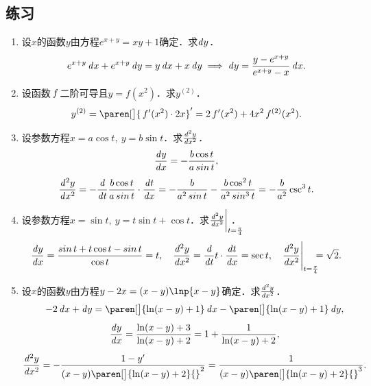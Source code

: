 \ifshowex
{}
\subsection*{练习}

\begin{enumerate}
\item 设\(x\)的函数\(y\)由方程\(e^{x+y} = xy + 1\)确定．求\(\dy\)．
  \ifshowsol
    \begin{equation*}
      e^{x+y} \dx + e^{x+y} \dy
      = y \dx + x \dy
      \implies
      \dy = \frac{y-e^{x+y}}{e^{x+y}-x} \dx.
    \end{equation*}
  \fi

\item 设函数\(\,f\mkern2mu\)二阶可导且\(y = f(x^2)\)．求\(y^{(2)}\)．
  \ifshowsol
    \begin{equation*}
      y^{(2)}
      = \paren[\big]{\,f'(x^2) \cdot 2x}'
      = 2\,f'(x^2) + 4x^2\,f^{(2)}(x^2).
    \end{equation*}
  \fi

\item 设参数方程\(x = a \cos t,\ y = b \sin t\)．求\(\ddn[y]x2\)．
  \ifshowsol
    \begin{gather*}
      \dydx = - \frac{b \cos t}{a \sin t}, \\[1ex]
      \ddn[y]x2
      = - \ddt \frac{b \cos t}{a \sin t} \cdot \dd[t]x
      = - \frac{b}{a^2 \sin t} - \frac{b \cos^2 t}{a^2 \sin^3 t}
      = - \frac{b}{a^2} \csc^3 t.
    \end{gather*}
  \fi

\item 设参数方程\(x = \sin t,\ y = t \sin t + \cos t\)．求\(\ddn[y]x2 \bigg\vert_{t=\frac\pi4}\mkern-24mu\)．
  \ifshowsol
    \begin{equation*}
      \dydx = \frac{\sin t + t \cos t - \sin t}{\cos t} = t,
      \quad
      \ddn[y]x2 = \ddt t \cdot \dd[t]x = \sec t,
      \quad
      \ddn[y]x2 \Bigg\vert_{t=\frac\pi4} \mkern-11mu = \sqrt2.
    \end{equation*}
  \fi

\item 设\(x\)的函数\(y\)由方程\(y - 2x = (x-y) \lnp{x-y}\)确定．求\(\ddn[y]x2\)．
  \ifshowsol
    \begin{gather*}
      -2\dx + \dy
      = \paren[\big]{\ln(x-y) + 1} \dx - \paren[\big]{\ln(x-y) + 1} \dy, \\[1ex]
      \dydx = \frac{\ln(x-y)+3}{\ln(x-y)+2} = 1 + \frac{1}{\ln(x-y)+2}, \\[1ex]
      \ddn[y]x2
      = - \frac{1-y'}{(x-y)\paren[\big]{\ln(x-y)+2}{}^2}
      = \frac{1}{(x-y)\paren[\big]{\ln(x-y)+2}{}^3}.
    \end{gather*}
  \fi


\end{enumerate}
